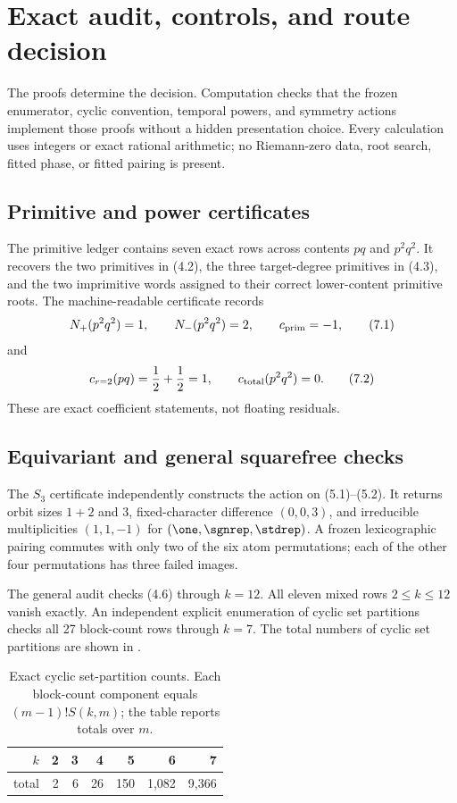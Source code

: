 \section{Exact audit, controls, and route decision}
\label{sec:audit}

The proofs determine the decision.  Computation checks that the frozen
enumerator, cyclic convention, temporal powers, and symmetry actions
implement those proofs without a hidden presentation choice.  Every
calculation uses integers or exact rational arithmetic; no Riemann-zero data,
root search, fitted phase, or fitted pairing is present.

\subsection{Primitive and power certificates}

The primitive ledger contains seven exact rows across contents $pq$ and
$p^2q^2$.  It recovers the two primitives in (4.2), the three target-degree
primitives in (4.3), and the two imprimitive words assigned to their correct
lower-content primitive roots.  The machine-readable certificate records
\[
  N_+(p^2q^2)=1,\qquad N_-(p^2q^2)=2,
  \qquad c_{\rm prim}=-1,
  \tag{7.1}
\]
and
\[
  c_{r=2}(pq)=\frac12+\frac12=1,
  \qquad c_{\rm total}(p^2q^2)=0.
  \tag{7.2}
\]
These are exact coefficient statements, not floating residuals.

\subsection{Equivariant and general squarefree checks}

The $S_3$ certificate independently constructs the action on (5.1)--(5.2).
It returns orbit sizes $1+2$ and $3$, fixed-character difference $(0,0,3)$,
and irreducible multiplicities $(1,1,-1)$ for
$(\one,\sgnrep,\stdrep)$.  A frozen lexicographic pairing commutes with only
two of the six atom permutations; each of the other four permutations has
three failed images.

The general audit checks (4.6) through $k=12$.  All eleven mixed rows
$2\le k\le12$ vanish exactly.  An independent explicit enumeration of cyclic
set partitions checks all 27 block-count rows through $k=7$.  The total
numbers of cyclic set partitions are shown in .

\begin{table}[t]
\centering
\caption{Exact cyclic set-partition counts.  Each block-count component
equals $(m-1)!S(k,m)$; the table reports totals over $m$.}
\label{tab:cyclic-counts}
\begin{tabular}{rrrrrrr}
\toprule
$k$ & 2 & 3 & 4 & 5 & 6 & 7\\
\midrule
total & 2 & 6 & 26 & 150 & 1,082 & 9,366\\
\bottomrule
\end{tabular}
\end{table}

